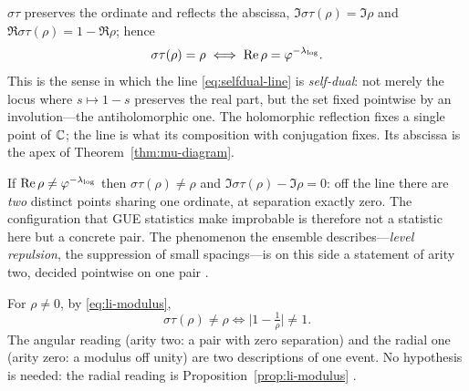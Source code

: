 \begin{proposition}\label{prop:line-fixed}
$\sigma\tau$ preserves the ordinate and reflects the abscissa,
$\Im\sigma\tau(\rho)=\Im\rho$ and $\Re\sigma\tau(\rho)=1-\Re\rho$; hence
\begin{equation}\label{eq:line-fixed}
  \sigma\tau(\rho)=\rho \iff \operatorname{Re}\rho=\varphi^{-\lambda_{\log}}.
\end{equation}
This is the sense in which the line \eqref{eq:selfdual-line} is \emph{self-dual}: not merely the
locus where $s\mapsto1-s$ preserves the real part, but the set fixed pointwise by an
involution---the antiholomorphic one. The holomorphic reflection fixes a single point of $\mathbb{C}$;
the line is what its composition with conjugation fixes. Its abscissa is the apex of
Theorem~\ref{thm:mu-diagram}.

\end{proposition}

\begin{proposition}\label{prop:arity-two}
If $\operatorname{Re}\rho\neq\varphi^{-\lambda_{\log}}$ then $\sigma\tau(\rho)\neq\rho$ and
$\Im\sigma\tau(\rho)-\Im\rho=0$: off the line there are \emph{two} distinct points sharing one
ordinate, at separation exactly zero. The configuration that GUE statistics make improbable is
therefore not a statistic here but a concrete pair. The phenomenon the ensemble
describes---\emph{level repulsion}, the suppression of small spacings---is on this side a
statement of arity two, decided pointwise on one pair .
\end{proposition}

\begin{proposition}\label{prop:two-readings}
For $\rho\neq0$, by \eqref{eq:li-modulus},
\begin{equation}\label{eq:two-readings}
  \sigma\tau(\rho)\neq\rho \iff \bigl\lvert1-\tfrac1\rho\bigr\rvert\neq1 .
\end{equation}
The angular reading (arity two: a pair with zero separation) and the radial one (arity zero: a
modulus off unity) are two descriptions of one event. No hypothesis is needed: the radial reading
is Proposition~\ref{prop:li-modulus} .
\end{proposition}

